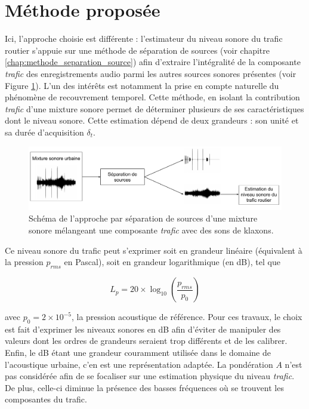 \section{Méthode proposée}\label{sect:methode}

Ici, l'approche choisie est différente : l'estimateur du niveau sonore du trafic routier s'appuie sur une méthode de séparation de sources (voir chapitre \ref{chap:methode_separation_source}) afin d'extraire l'intégralité de la composante \textit{trafic} des enregistrements audio parmi les autres sources sonores présentes (voir Figure \ref{fig:separation_source}). L'un des intérêts est notamment la prise en compte naturelle du phénomène de recouvrement temporel. 
Cette méthode, en isolant la contribution \textit{trafic} d'une mixture sonore permet de déterminer plusieurs de ses caractéristiques dont le niveau sonore. Cette estimation dépend de deux grandeurs : son unité et sa durée d'acquisition $\delta_t$.

\begin{figure}[ht]
\centering
\includegraphics[width=0.9\linewidth]{./figures/autres/schema_source_separation_FR.pdf}
\caption{Schéma de l'approche par séparation de sources d'une mixture sonore mélangeant une composante \textit{trafic} avec des sons de klaxons.}
\label{fig:separation_source}
\end{figure}

Ce niveau sonore du trafic peut s'exprimer soit en grandeur linéaire (équivalent à la pression $p_{rms}$ en Pascal), soit en grandeur logarithmique (en dB), tel que

\begin{equation}\label{eq:Lp}
L_{p} = 20 \times \log_{10} \left( \frac{p_{rms}}{p_0} \right)
\end{equation}

avec $p_0 = 2\times 10^{-5}$, la pression acoustique de référence. Pour ces travaux, le choix est fait d'exprimer les niveaux sonores en dB afin d'éviter de manipuler des valeurs dont les ordres de grandeurs seraient trop différents et de les calibrer. Enfin, le dB étant une grandeur couramment utilisée dans le domaine de l'acoustique urbaine, c'en est une représentation adaptée. La pondération $A$ n'est pas considérée afin de se focaliser sur une estimation physique du niveau \textit{trafic}. De plus, celle-ci diminue la présence des basses fréquences où se trouvent les composantes du trafic. 

